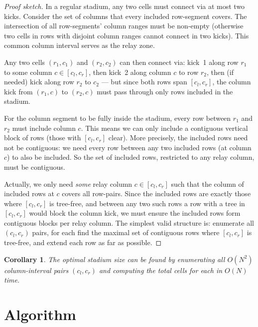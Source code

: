 \documentclass[11pt,a4paper]{article}
\newtheorem{corollary}[theorem]{Corollary}
\begin{document}
\begin{proof}[Proof sketch]
In a regular stadium, any two cells must connect via at most two kicks.
Consider the set of columns that every included row-segment covers.
The intersection of all row-segments' column ranges must be non-empty
(otherwise two cells in rows with disjoint column ranges cannot connect
in two kicks).  This common column interval serves as the relay zone.

Any two cells $(r_1, c_1)$ and $(r_2, c_2)$ can then connect via:
kick~1 along row $r_1$ to some column $c \in [c_l, c_r]$, then kick~2
along column $c$ to row $r_2$, then (if needed) kick along row $r_2$ to
$c_2$ --- but since both rows span $[c_l, c_r]$, the column kick from
$(r_1, c)$ to $(r_2, c)$ must pass through only rows included in the
stadium.

For the column segment to be fully inside the stadium, every row between
$r_1$ and $r_2$ must include column $c$.  This means we can only include
a contiguous vertical block of rows (those with $[c_l, c_r]$ clear).
More precisely, the included rows need not be contiguous: we need every
row between any two included rows (at column $c$) to also be included.
So the set of included rows, restricted to any relay column, must be
contiguous.

Actually, we only need \emph{some} relay column $c \in [c_l, c_r]$ such
that the column of included rows at $c$ covers all row-pairs.  Since the
included rows are exactly those where $[c_l, c_r]$ is tree-free, and
between any two such rows a row with a tree in $[c_l, c_r]$ would block
the column kick, we must ensure the included rows form contiguous blocks
per relay column.  The simplest valid structure is: enumerate all
$(c_l, c_r)$ pairs, for each find the maximal set of contiguous rows
where $[c_l, c_r]$ is tree-free, and extend each row as far as possible.
\end{proof}

\begin{corollary}
The optimal stadium size can be found by enumerating all $O(N^2)$
column-interval pairs $(c_l, c_r)$ and computing the total cells for
each in $O(N)$ time.
\end{corollary}

\section{Algorithm}
\end{document}
